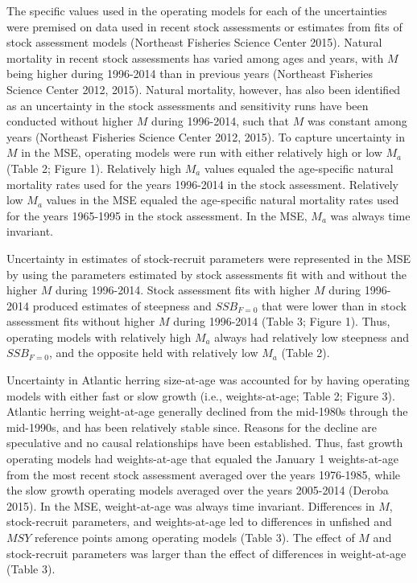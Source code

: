 \documentclass[]{article}
\begin{document}
The specific values used in the operating models for each of the
uncertainties were premised on data used in recent stock assessments or
estimates from fits of stock assessment models (Northeast Fisheries
Science Center 2015). Natural mortality in recent stock assessments has
varied among ages and years, with \(M\) being higher during 1996-2014
than in previous years (Northeast Fisheries Science Center 2012, 2015).
Natural mortality, however, has also been identified as an uncertainty
in the stock assessments and sensitivity runs have been conducted
without higher \(M\) during 1996-2014, such that \(M\) was constant
among years (Northeast Fisheries Science Center 2012, 2015). To capture
uncertainty in \(M\) in the MSE, operating models were run with either
relatively high or low \(M_a\) (Table 2; Figure 1). Relatively high
\(M_a\) values equaled the age-specific natural mortality rates used for
the years 1996-2014 in the stock assessment. Relatively low \(M_a\)
values in the MSE equaled the age-specific natural mortality rates used
for the years 1965-1995 in the stock assessment. In the MSE, \(M_a\) was
always time invariant.

Uncertainty in estimates of stock-recruit parameters were represented in
the MSE by using the parameters estimated by stock assessments fit with
and without the higher \(M\) during 1996-2014. Stock assessment fits
with higher \(M\) during 1996-2014 produced estimates of steepness and
\(SSB_{F=0}\) that were lower than in stock assessment fits without
higher \(M\) during 1996-2014 (Table 3; Figure 1). Thus, operating
models with relatively high \(M_a\) always had relatively low steepness
and \(SSB_{F=0}\), and the opposite held with relatively low \(M_a\)
(Table 2).

Uncertainty in Atlantic herring size-at-age was accounted for by having
operating models with either fast or slow growth (i.e., weights-at-age;
Table 2; Figure 3). Atlantic herring weight-at-age generally declined
from the mid-1980s through the mid-1990s, and has been relatively stable
since. Reasons for the decline are speculative and no causal
relationships have been established. Thus, fast growth operating models
had weights-at-age that equaled the January 1 weights-at-age from the
most recent stock assessment averaged over the years 1976-1985, while
the slow growth operating models averaged over the years 2005-2014
(Deroba 2015). In the MSE, weight-at-age was always time invariant.
Differences in \(M\), stock-recruit parameters, and weights-at-age led
to differences in unfished and \(MSY\) reference points among operating
models (Table 3). The effect of \(M\) and stock-recruit parameters was
larger than the effect of differences in weight-at-age (Table 3).
\end{document}
